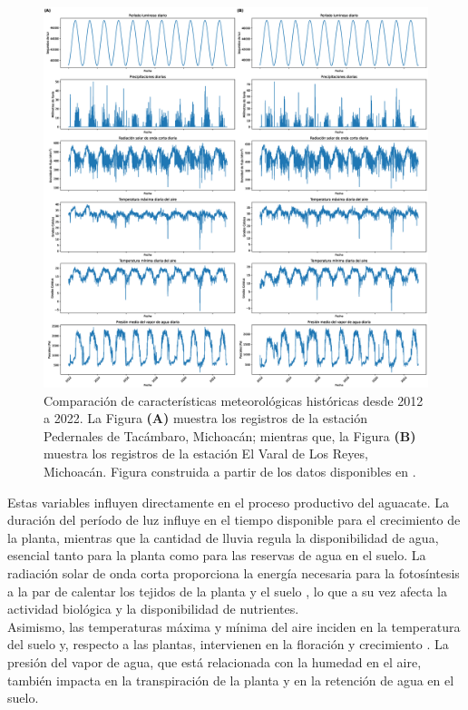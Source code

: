 \begin{figure}[!ht]
    \centering
    \includegraphics[width=1\linewidth]{Images/Meteorological_comparison.eps}
    \caption{Comparación de características meteorológicas históricas desde 2012 a 2022. La Figura \textbf{(A)} muestra los registros de la estación Pedernales de Tacámbaro, Michoacán; mientras que, la Figura \textbf{(B)} muestra los registros de la estación El Varal de Los Reyes, Michoacán. Figura construida a partir de los datos disponibles en \cite{Rodriguez-Moreno_2021}.}
    \label{fig:Meteorological_comparison}
\end{figure}


Estas variables influyen directamente en el proceso productivo del aguacate. La duración del período de luz influye en el tiempo disponible para el crecimiento de la planta, mientras que la cantidad de lluvia regula la disponibilidad de agua, esencial tanto para la planta como para las reservas de agua en el suelo. La radiación solar de onda corta proporciona la energía necesaria para la fotosíntesis a la par de calentar los tejidos de la planta y el suelo \cite{Jagadish_2021}, lo que a su vez afecta la actividad biológica y la disponibilidad de nutrientes.\\

Asimismo, las temperaturas máxima y mínima del aire inciden en la temperatura del suelo y, respecto a las plantas, intervienen en la floración y crecimiento \cite{Idso_1987}. La presión del vapor de agua, que está relacionada con la humedad en el aire, también impacta en la transpiración de la planta y en la retención de agua en el suelo.\\

